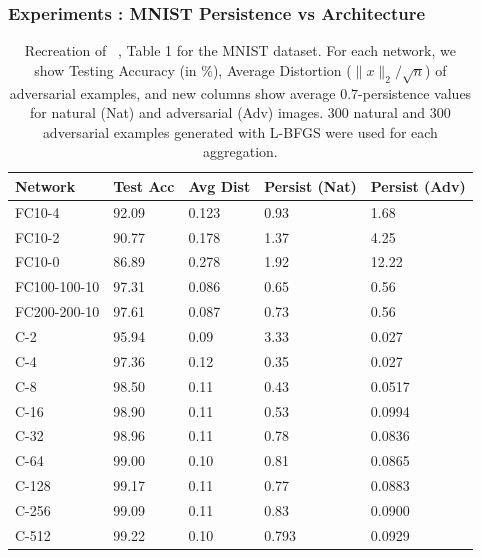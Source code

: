 
\begin{frame}
  \frametitle{Experiments : MNIST Persistence vs Architecture}
 \begin{table}[ht]
 \centering
 \caption{Recreation of ~\citet{szegedy2013intriguing}, Table 1 for the MNIST dataset.  For each network, we show Testing Accuracy (in \%), Average Distortion ($\|x\|_2/\sqrt{n}$) of adversarial examples, and new columns show average $0.7$-persistence values for natural (Nat) and adversarial (Adv) images. 300 natural and 300 adversarial examples generated with L-BFGS were used for each aggregation.}
 \label{table1}
 \begin{tabular}{lllll}
 \toprule
 Network & Test Acc & Avg Dist & Persist (Nat) & Persist (Adv) \\
 \midrule
 FC10-4 & 92.09 & 0.123 & 0.93 & 1.68\\
 FC10-2 & 90.77 & 0.178 & 1.37 & 4.25\\
 FC10-0 & 86.89 & 0.278 & 1.92 & 12.22\\
 FC100-100-10 & 97.31 & 0.086 & 0.65 & 0.56 \\
 FC200-200-10 & 97.61 & 0.087 & 0.73 & 0.56 \\
 \midrule
 C-2 & 95.94 & 0.09 & 3.33 & 0.027 \\
 C-4 & 97.36 & 0.12 & 0.35 & 0.027 \\
 C-8 & 98.50 & 0.11 & 0.43  & 0.0517 \\
 C-16 & 98.90 & 0.11 & 0.53 & 0.0994 \\
 C-32 & 98.96 & 0.11 & 0.78 & 0.0836 \\
 C-64 & 99.00 & 0.10 & 0.81 & 0.0865 \\
 C-128 & 99.17 & 0.11 & 0.77 & 0.0883 \\
 C-256 & 99.09 & 0.11  & 0.83 & 0.0900 \\
 C-512 & 99.22 & 0.10 & 0.793 & 0.0929 \\

 \bottomrule
 \end{tabular}
 \end{table}
\end{frame}
